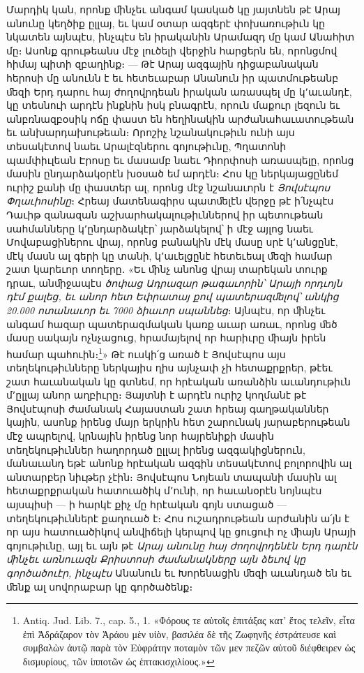 \documentclass{article}
\begin{document}
{Մարդիկ կան, որոնք ﬕնչեւ անգամ կասկած կը յայտնեն թէ Արայ անունը կեղծիք ըլլայ, եւ կամ օտար ազգերէ փոխառութիւն կը նկատեն այնպէս, ինչպէս են իրականին Արամազդ մը կամ Անահիտ մը։ Ասոնք գրութեանս մէջ լուծելի վերջին հարցերն են, որոնցմով հիմայ պիտի զբաղինք։ — Թէ Արայ ազգային դիցաբանական հերոսի մը անունն է եւ հետեւաբար Անանուն իր պատմութեանբ ﬔզի Երդ դարու հայ ժողովրդեան իրական առասպել մը կ՚աւանդէ, կը տեսնուի արդէն ինքնին իսկ բնագրէն, որուն մաքուր լեզուն եւ անբռնազբօսիկ ոճը փաստ են հեղինակին արժանահաւատութեան եւ անխարդախութեան։ Որոշիչ նշանակութիւն ունի այս տեսակէտով նաեւ Արալէզներու գոյութիւնը, Պղատոնի պամփիւլեան Էրոսը եւ մասամբ նաեւ Դիորփոսի առասպելը, որոնց մասին ընդարձակօրէն խօսած եմ արդէն։ Հոս կը ներկայացընեմ ուրիշ քանի մը փաստեր ալ, որոնց մէջ նշանաւորն է \emph{Յովսէպոս Փղաւիոսինը}։ Հրեայ մատենագիրս պատﬔլէն վերջը թէ ի՛նչպէս Դաւիթ զանազան աշխարհակալութիւններով իր պետութեան սահմանները կ՚ընդարձակէր՝ յարձակելով՝ ի մէջ այլոց նաեւ Մովաբացիներու վրայ, որոնց բանակին մէկ մասը սրէ կ՚անցընէ, մէկ մասն ալ գերի կը տանի, կ՚աւելցընէ հետեւեալ ﬔզի համար շատ կարեւոր տողերը․ «Եւ ﬕնչ անոնց վրայ տարեկան տուրք դրաւ, անﬕջապէս \emph{ծոփաց Ադրազար թագաւորին՝ Արայի որդւոյն դէմ քալեց, եւ անոր հետ Եփրատայ քով պատերազﬔլով՝ անկից 20.000 ոտանաւոր եւ 7000 ձիաւոր սպաննեց}։ Այնպէս, որ ﬕնչեւ անգամ հազար պատերազմական կառք աւար առաւ, որոնց ﬔծ մասը սակայն ոչնչացուց, հրամայելով որ հարիւրը ﬕայն իրեն համար պահուին։\footnote{Antiq. Jud. Lib. 7., cap. 5., 1. «Φόρους τε αὐτοῖς ἐπιτάξας κατ' ἔτος τελεῖν, εἶτα ἐπὶ Ἀδράζαρον τὸν Ἀράου μὲν υἱὸν, βασιλέα δὲ τῆς Ζωφηνῆς ἐστράτευσε καὶ συμβαλὼν ἀυτῷ παρὰ τὸν Εὐφράτην ποταμὸν τῶν μεν πεζῶν αὐτοῦ διέφθειρεν ὡς δισμυρίους, τῶν ἱπποτῶν ὡς ἑπτακισχιλίους.»}» Թէ ուսկի՛ց առած է Յովսէպոս այս տեղեկութիւնները ներկայիս ղիս այնչափ չի հետաքրքրեր, թէեւ շատ հաւանական կը գտնեմ, որ հրէական առանձին աւանդութիւն մ՚ըլլայ անոր աղբիւրը։ Յայտնի է արդէն ուրիշ կողմանէ թէ Յովսէպոսի ժամանակ Հայաստան շատ հրեայ գաղթականներ կային, ասոնք իրենց մայր երկրին հետ շարունակ յարաբերութեան մէջ ապրելով, կրնային իրենց նոր հայրենիքի մասին տեղեկութիւններ հաղորդած ըլլալ իրենց ազգակիցներուն, մանաւանդ եթէ անոնք հրէական ազգին տեսակէտով բոլորովին ալ անտարբեր նիւթեր չէին։ Յովսէպոս Նոյեան տապանի մասին ալ հետաքրքրական հատուածիկ մ՚ունի, որ հաւանօրէն նոյնպէս այսպիսի — ի հարկէ քիչ մը հրէական գոյն ստացած — տեղեկութիւններէ քաղուած է։ Հոս ուշադրութեան արժանին ա՛յն է որ այս հատուածիկով անվիճելի կերպով կը ցուցուի ոչ ﬕայն Արայի գոյութիւնը, այլ եւ այն թէ \emph{Արայ անունը հայ ժողովրդենէն Երդ դարէն ﬕնչեւ առնուազն Քրիստոսի ժամանակները այն ձեւով կը գործածուէր, ինչպէս} Անանուն եւ Խորենացին ﬔզի աւանդած են եւ ﬔնք ալ սովորաբար կը գործածենք։

}
\end{document}
